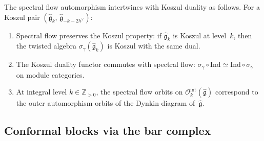 \begin{proposition}
\label{prop:spectral-flow-koszul}
The spectral flow automorphism intertwines with Koszul duality as
follows.  For a Koszul pair $(\widehat{\mathfrak{g}}_k,\,
\widehat{\mathfrak{g}}_{-k-2h^\vee})$:
\begin{enumerate}[label=(\roman*)]
\item Spectral flow preserves the Koszul property: if
   $\widehat{\mathfrak{g}}_k$ is Koszul at level~$k$, then the twisted
   algebra $\sigma_\gamma(\widehat{\mathfrak{g}}_k)$ is Koszul with the
   same dual.
\item The Koszul duality functor commutes with spectral flow:
   $\sigma_\gamma \circ \mathrm{Ind} \simeq \mathrm{Ind} \circ
   \sigma_\gamma$ on module categories.
\item At integral level $k \in \mathbb{Z}_{>0}$, the spectral flow
   orbits on $\mathcal{O}_k^{\mathrm{int}}(\widehat{\mathfrak{g}})$
   correspond to the outer automorphism orbits of the Dynkin diagram
   of~$\widehat{\mathfrak{g}}$.
\end{enumerate}
\end{proposition}

\subsection{Conformal blocks via the bar complex}
\label{sec:km-conformal-blocks}

